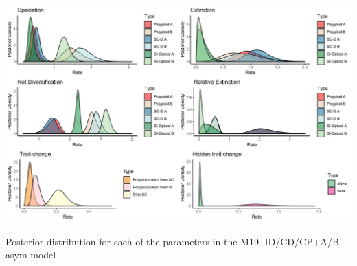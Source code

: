 \begin{suppfigure}
\includegraphics[width=\textwidth]{muhissenodipasymposteriordist.pdf}
\caption{Posterior distribution for each of the parameters in the M19. ID/CD/CP+A/B asym model} %
\label{suppfigure:IDCDCPnodipAB}
\end{suppfigure}
